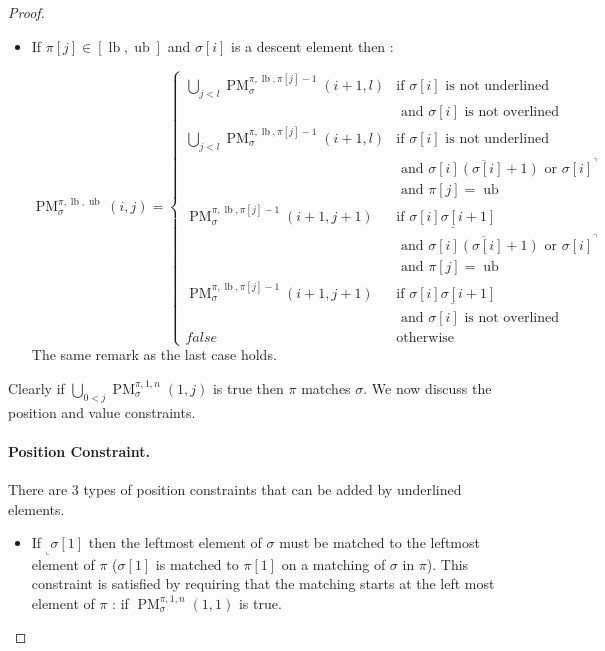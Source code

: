 \documentclass[a4paper]{llncs}
\newcommand{\ptext}{\pi}
\newcommand{\ppattern}{\sigma}
\DeclareMathOperator{\PMa}{PM}
\newcommand{\PM}[6]{\PMa_{{#1}}^{{#2},{#3},{#4}}({#5},{#6})}
\DeclareMathOperator{\lb}{lb}
\DeclareMathOperator{\ub}{ub}
\begin{document}
\begin{proof}
\begin{itemize}
	\item If $\ptext[j] \in [\lb,\ub]$ and $\ppattern[i]$ is a descent element then :

	$$
	\PM{\sigma}{\ptext}{\lb}{\ub}{i}{j}=
	\begin{cases}
			\bigcup_{j<l} \PM{\sigma}{\ptext}{\lb}{\ptext[j]-1}{i+1}{l}
				& \text{if $\ppattern[i]$ is not underlined } \\
				& \text{ and $\ppattern[i]$ is not overlined} \\
			\bigcup_{j<l} \PM{\sigma}{\ptext}{\lb}{\ptext[j]-1}{i+1}{l}
				& \text{if $\ppattern[i]$ is not underlined } \\
				& \text{ and $\overline{\ppattern[i](\ppattern[i]+1)}$ or ${\ppattern[i]}^\urcorner$}\\
				& \text{ and $\ptext[j]=\ub$} \\
			\PM{\sigma}{\ptext}{\lb}{\ptext[j]-1}{i+1}{j+1}
				& \text{if $\underline{\ppattern[i]\ppattern[i+1]}$ } \\
				& \text{ and $\overline{\ppattern[i](\ppattern[i]+1)}$ or ${\ppattern[i]}^\urcorner$}\\
				& \text{ and $\ptext[j]=\ub$} \\
			\PM{\sigma}{\ptext}{\lb}{\ptext[j]-1}{i+1}{j+1}
				& \text{if $\underline{\ppattern[i]\ppattern[i+1]}$ } \\
				& \text{ and $\ppattern[i]$ is not overlined} \\
			false & \text{otherwise}
	\end{cases}
	$$	
	The same remark as the last case holds.

\end{itemize}

Clearly if $\bigcup_{0<j} \PM{\sigma}{\ptext}{1}{n}{1}{j}$ is true then $\pi$ matches $\sigma$. We now discuss the position and value constraints.
\paragraph{Position Constraint.} There are 3 types of position constraints that can be added by underlined elements.
\begin{itemize}
	\item If $_\llcorner{\sigma[1]}$ then the leftmost element of $\sigma$  must be matched to the leftmost element of $\pi$ ($\ppattern[1]$ is matched to $\ptext[1]$ on a matching of $\ppattern$ in $\ptext$). This constraint is satisfied by requiring that the matching starts at the left most element of $\ptext$ : if  $\PM{\sigma}{\ptext}{1}{n}{1}{1}$ is true.
	

\end{itemize}
\end{proof}
\end{document}
